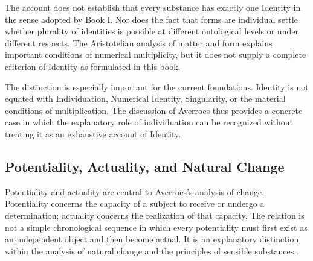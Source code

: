 \label{para:VS.B01.P01.C08.S15.SS10.P003}

The account does not establish that every substance
has exactly one Identity in the sense adopted by
Book I. Nor does the fact that forms are individual
settle whether plurality of identities is possible
at different ontological levels or under different
respects. The Aristotelian analysis of matter and
form explains important conditions of numerical
multiplicity, but it does not supply a complete
criterion of Identity as formulated in this book.

\label{para:VS.B01.P01.C08.S15.SS10.P004}

The distinction is especially important for the
current foundations. Identity is not equated with
Individuation, Numerical Identity, Singularity, or
the material conditions of multiplication. The
discussion of Averroes thus provides a concrete
case in which the explanatory role of individuation
can be recognized without treating it as an exhaustive
account of Identity.



\subsection{Potentiality, Actuality, and Natural Change}
\label{subsec:ch08_s15_ss11}

\label{para:VS.B01.P01.C08.S15.SS11.P001}

Potentiality and actuality are central to Averroes's
analysis of change. Potentiality concerns the capacity
of a subject to receive or undergo a determination;
actuality concerns the realization of that capacity.
The relation is not a simple chronological sequence
in which every potentiality must first exist as an
independent object and then become actual. It is
an explanatory distinction within the analysis of
natural change and the principles of sensible
substances
\citep{AristotleMetaphysics,
AristotlePhysics,
AverroesEpitomeMetaphysicsArnzen2010}.

\label{para:VS.B01.P01.C08.S15.SS11.P002}

